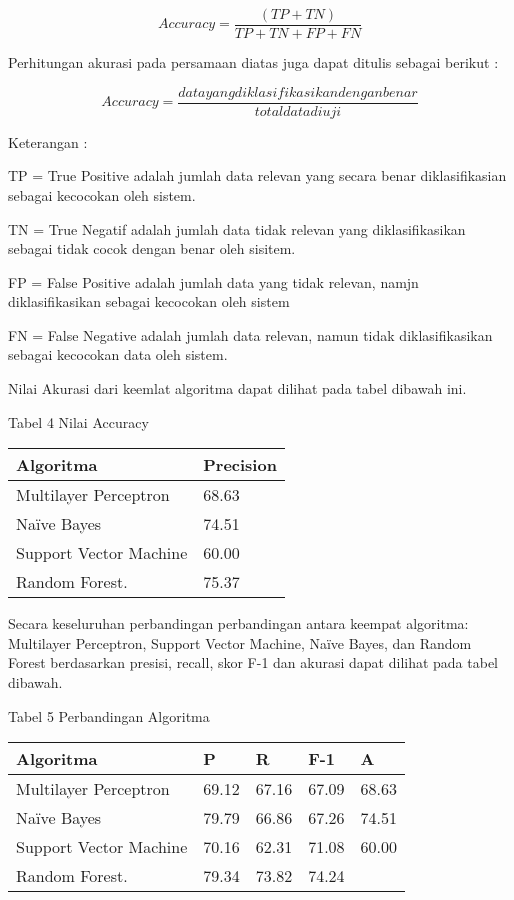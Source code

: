 \documentclass{article}
\begin{document}
$$ Accuracy =\frac{(TP + TN)}{TP + TN + FP + FN}$$

Perhitungan akurasi pada persamaan diatas juga dapat ditulis sebagai berikut :

$$ Accuracy =\frac{data yang diklasifikasikan dengan benar}{total data diuji}$$

Keterangan :

TP = True Positive adalah jumlah data relevan yang secara benar diklasifikasian 
sebagai kecocokan oleh sistem.

TN = True Negatif adalah jumlah data tidak relevan yang diklasifikasikan sebagai tidak 
cocok dengan benar oleh sisitem.

FP = False Positive adalah jumlah data yang tidak relevan, namjn diklasifikasikan 
sebagai kecocokan oleh sistem

FN = False Negative adalah jumlah data relevan, namun tidak diklasifikasikan sebagai 
kecocokan data oleh sistem.

Nilai Akurasi dari keemlat algoritma dapat dilihat pada tabel dibawah ini.

\begin{center}
Tabel 4 Nilai Accuracy

\begin{tabular}{ |p{5cm}||p{3cm}|  }
 \hline
 Algoritma & Precision \\
 \hline
 Multilayer Perceptron   & 68.63    \\
 Naïve Bayes &   74.51  \\
 Support Vector Machine & 60.00 \\
 Random Forest.    & 75.37 \\
 \hline
\end{tabular}
\end{center}

Secara keseluruhan perbandingan perbandingan antara keempat algoritma: Multilayer 
Perceptron, Support Vector Machine, Naïve Bayes, dan Random Forest berdasarkan 
presisi, recall, skor F-1 dan akurasi dapat dilihat pada tabel dibawah.

\begin{center}
Tabel 5 Perbandingan Algoritma

\begin{tabular}{ |p{5cm}||p{3cm}| |p{3cm}||p{3cm}||p{3cm}| }
 \hline
 Algoritma & P & R & F-1 & A \\
 \hline
 Multilayer Perceptron   & 69.12 & 67.16 & 67.09 & 68.63     \\
 Naïve Bayes &   79.79 & 66.86 & 67.26 & 74.51   \\
 Support Vector Machine & 70.16 & 62.31 & 71.08 & 60.00  \\
 Random Forest.    & 79.34 & 73.82 & 74.24 &   \\
 \hline
\end{tabular}
\end{center}
\end{document}
